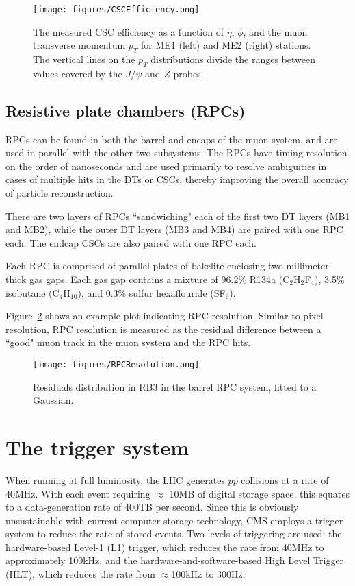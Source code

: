 \begin{figure}\centering
  \texttt{[image: figures/CSCEfficiency.png]}
  \caption{\label{fig:CSCEfficiency} The measured CSC efficiency as a function of $\eta$, $\phi$, and the muon transverse momentum $p_T$ for ME1 (left) and ME2 (right) stations. The vertical lines on the $p_T$ distributions divide the ranges between values covered by the $J/\psi$ and $Z$ probes.}
\end{figure}

\subsection{Resistive plate chambers (RPCs)}

RPCs can be found in both the barrel and encaps of the muon system, and are used in parallel with the other two subsystems. The RPCs have timing resolution on the order of nanoseconds and are used primarily to resolve ambiguities in cases of multiple hits in the DTs or CSCs, thereby improving the overall accuracy of particle reconstruction.

There are two layers of RPCs ``sandwiching" each of the first two DT layers (MB1 and MB2), while the outer DT layers (MB3 and MB4) are paired with one RPC each. The endcap CSCs are also paired with one RPC each. 

Each RPC is comprised of parallel plates of bakelite enclosing two millimeter-thick gas gaps. Each gas gap contains a mixture of 96.2\% R134a (C$_2$H$_2$F$_4$), 3.5\% isobutane (C$_4$H$_10$), and 0.3\% sulfur hexaflouride (SF$_6$).

Figure~\ref{fig:RPCResolution} shows an example plot indicating RPC resolution. Similar to pixel resolution, RPC resolution is measured as the residual difference between a ``good" muon track in the muon system and the RPC hits. %

\begin{figure}\centering
  \texttt{[image: figures/RPCResolution.png]}
  \caption{\label{fig:RPCResolution} Residuals distribution in RB3 in the barrel RPC system, fitted to a Gaussian.}
\end{figure}


\section{The trigger system}

When running at full luminosity, the LHC generates $pp$ collisions at a rate of 40MHz. With each event requiring $\approx$ 10MB of digital storage space, this equates to a data-generation rate of 400TB per second. Since this is obviously unsustainable with current computer storage technology, CMS employs a trigger system to reduce the rate of stored events. Two levels of triggering are used: the hardware-based Level-1 (L1) trigger, which reduces the rate from 40MHz to approximately 100kHz, and the hardware-and-software-based High Level Trigger (HLT), which reduces the rate from $\approx$100kHz to 300Hz.

